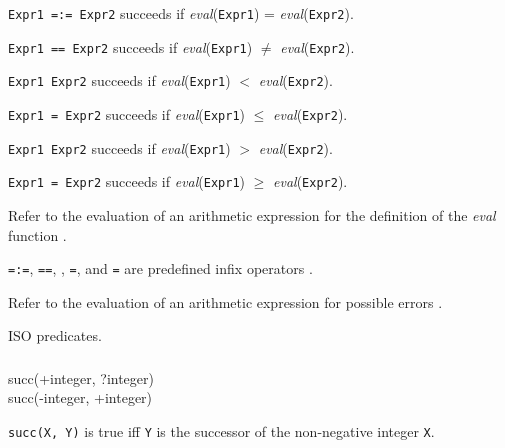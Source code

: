 \Description

\texttt{Expr1 =:= Expr2} succeeds if \textit{eval}(\texttt{Expr1}) =
\textit{eval}(\texttt{Expr2}).

\texttt{Expr1 ={\bs}= Expr2} succeeds if \textit{eval}(\texttt{Expr1})
$\neq$ \textit{eval}(\texttt{Expr2}).

\texttt{Expr1 {\lt} Expr2} succeeds if \textit{eval}(\texttt{Expr1}) $<$
\textit{eval}(\texttt{Expr2}).

\texttt{Expr1 ={\lt} Expr2} succeeds if \textit{eval}(\texttt{Expr1})
$\leq$ \textit{eval}(\texttt{Expr2}).

\texttt{Expr1 {\gt} Expr2} succeeds if \textit{eval}(\texttt{Expr1}) $>$
\textit{eval}(\texttt{Expr2}).

\texttt{Expr1 {\gt}= Expr2} succeeds if \textit{eval}(\texttt{Expr1})
$\geq$ \textit{eval}(\texttt{Expr2}).

Refer to the evaluation of an arithmetic expression for the definition of
the \textit{eval} function .

\texttt{=:=}, \texttt{={\bs}=}, \texttt{{\lt}}, \texttt{={\lt}},
\texttt{{\gt}} and \texttt{{\gt}=} are predefined infix operators
.

\Errors

Refer to the evaluation of an arithmetic expression for possible errors
.

\Portability

ISO predicates.



\subsubsection{}

\begin{TemplatesOneCol}
succ(+integer, ?integer) \\
succ(-integer, +integer) 

\end{TemplatesOneCol}

\Description

\texttt{succ(X, Y)} is true iff \texttt{Y} is the successor of the non-negative integer \texttt{X}. 

\begin{PlErrors}






\end{PlErrors}

